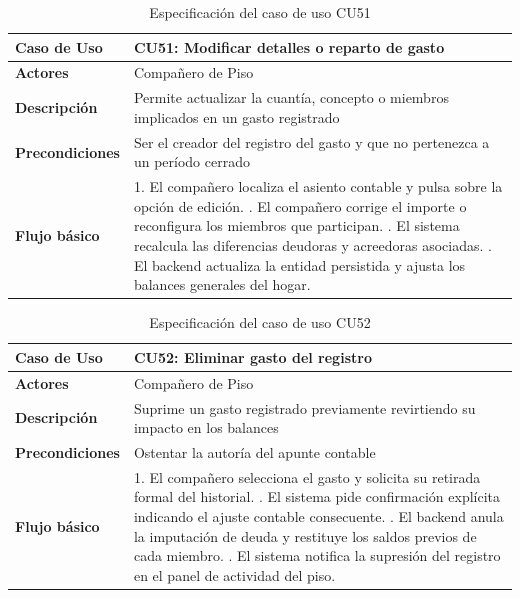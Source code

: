\begin{table}[H]
\centering
\begin{tabular}{|p{3.2cm}|p{11.3cm}|}
\hline
\textbf{Caso de Uso} & \textbf{CU51: Modificar detalles o reparto de gasto} \\ \hline
\textbf{Actores} & Compañero de Piso \\ \hline
\textbf{Descripción} & Permite actualizar la cuantía, concepto o miembros implicados en un gasto registrado \\ \hline
\textbf{Precondiciones} & Ser el creador del registro del gasto y que no pertenezca a un período cerrado \\ \hline
\textbf{Flujo básico} & 
1. El compañero localiza el asiento contable y pulsa sobre la opción de edición. \newline
2. El compañero corrige el importe o reconfigura los miembros que participan. \newline
3. El sistema recalcula las diferencias deudoras y acreedoras asociadas. \newline
4. El backend actualiza la entidad persistida y ajusta los balances generales del hogar. \\ \hline
\end{tabular}
\caption{Especificación del caso de uso CU51}
\label{tab:cu51}
\end{table}

\begin{table}[H]
\centering
\begin{tabular}{|p{3.2cm}|p{11.3cm}|}
\hline
\textbf{Caso de Uso} & \textbf{CU52: Eliminar gasto del registro} \\ \hline
\textbf{Actores} & Compañero de Piso \\ \hline
\textbf{Descripción} & Suprime un gasto registrado previamente revirtiendo su impacto en los balances \\ \hline
\textbf{Precondiciones} & Ostentar la autoría del apunte contable \\ \hline
\textbf{Flujo básico} & 
1. El compañero selecciona el gasto y solicita su retirada formal del historial. \newline
2. El sistema pide confirmación explícita indicando el ajuste contable consecuente. \newline
3. El backend anula la imputación de deuda y restituye los saldos previos de cada miembro. \newline
4. El sistema notifica la supresión del registro en el panel de actividad del piso. \\ \hline
\end{tabular}
\caption{Especificación del caso de uso CU52}
\label{tab:cu52}
\end{table}

